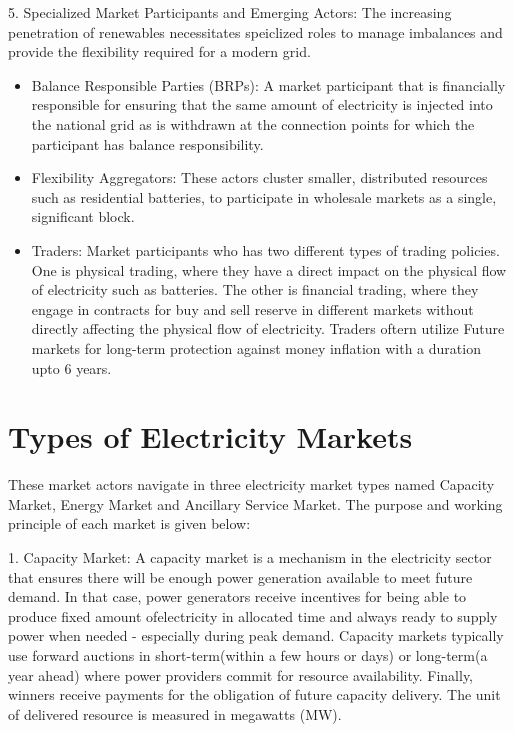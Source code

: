 5. Specialized Market Participants and Emerging Actors: The increasing penetration of renewables necessitates speiclized roles to manage imbalances and provide the flexibility required for a modern grid. 
    \begin{itemize}
        \item Balance Responsible Parties (BRPs): A market participant that is financially responsible for ensuring that the same amount of electricity is injected into the national grid as is withdrawn at the connection points for which the participant has balance responsibility. 
        \item Flexibility Aggregators: These actors cluster smaller, distributed resources such as residential batteries, to participate in wholesale markets as a single, significant block.
        \item Traders: Market participants who has two different types of trading policies. One is physical trading, where they have a direct impact on the physical flow of electricity such as batteries. The other is financial trading, where they engage in contracts for buy and sell reserve in different markets without directly affecting the physical flow of electricity. Traders oftern utilize Future markets for long-term protection against money inflation with a duration upto 6 years.
    \end{itemize}


\section{Types of Electricity Markets}
These market actors navigate in three electricity market types named Capacity Market, Energy Market and Ancillary Service Market. The purpose and working principle of each market is given below:

1. Capacity Market: A capacity market is a mechanism in the electricity sector that ensures there will be enough power generation available to meet future demand. In that case, power generators receive incentives for being able to produce fixed amount ofelectricity in allocated time and always ready to supply power when needed - especially during peak demand. Capacity markets typically use forward auctions in short-term(within a few hours or days) or long-term(a year ahead) where power providers commit for resource  availability. Finally, winners receive payments for the obligation of future capacity delivery. The unit of delivered resource is measured in megawatts (MW).

